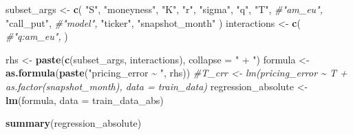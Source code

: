 \documentclass[
]{article}
\newenvironment{Shaded}{\begin{snugshade}}{\end{snugshade}}
\newcommand{\AttributeTok}[1]{\textcolor[rgb]{0.13,0.29,0.53}{#1}}
\newcommand{\CommentTok}[1]{\textcolor[rgb]{0.56,0.35,0.01}{\textit{#1}}}
\newcommand{\FunctionTok}[1]{\textcolor[rgb]{0.13,0.29,0.53}{\textbf{#1}}}
\newcommand{\NormalTok}[1]{#1}
\newcommand{\OtherTok}[1]{\textcolor[rgb]{0.56,0.35,0.01}{#1}}
\newcommand{\StringTok}[1]{\textcolor[rgb]{0.31,0.60,0.02}{#1}}
\begin{document}
\begin{Shaded}
\begin{Highlighting}[]
\NormalTok{subset\_args }\OtherTok{\textless{}{-}} \FunctionTok{c}\NormalTok{(}
  \StringTok{"S"}\NormalTok{,}
  \StringTok{"moneyness"}\NormalTok{,}
  \StringTok{"K"}\NormalTok{,}
  \StringTok{"r"}\NormalTok{,}
  \StringTok{"sigma"}\NormalTok{,}
  \StringTok{"q"}\NormalTok{,}
  \StringTok{"T"}\NormalTok{,}
  \CommentTok{\#"am\_eu",}
  \StringTok{"call\_put"}\NormalTok{,}
  \CommentTok{\#"model",}
  \StringTok{"ticker"}\NormalTok{,}
  \StringTok{"snapshot\_month"}
\NormalTok{  )}
\NormalTok{interactions }\OtherTok{\textless{}{-}} \FunctionTok{c}\NormalTok{(}
  \CommentTok{\#"q:am\_eu",}
\NormalTok{)}

\NormalTok{rhs }\OtherTok{\textless{}{-}} \FunctionTok{paste}\NormalTok{(}\FunctionTok{c}\NormalTok{(subset\_args, interactions), }\AttributeTok{collapse =} \StringTok{" + "}\NormalTok{)}
\NormalTok{formula }\OtherTok{\textless{}{-}} \FunctionTok{as.formula}\NormalTok{(}\FunctionTok{paste}\NormalTok{(}\StringTok{"pricing\_error \textasciitilde{} "}\NormalTok{, rhs))}
\CommentTok{\#T\_crr \textless{}{-} lm(pricing\_error \textasciitilde{} T + as.factor(snapshot\_month), data = train\_data)}
\NormalTok{regression\_absolute }\OtherTok{\textless{}{-}} \FunctionTok{lm}\NormalTok{(formula, }\AttributeTok{data =}\NormalTok{ train\_data\_abs)}

\FunctionTok{summary}\NormalTok{(regression\_absolute)}
\end{Highlighting}
\end{Shaded}
\end{document}
